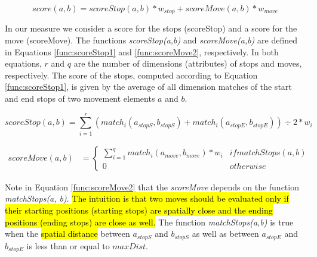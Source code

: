\documentclass[12pt]{article}
\begin{document}
\begin{equation}
\label{func:score1}
score(a, b) = scoreStop(a, b) * w_{stop} + scoreMove(a, b) * w_{move}  
\end{equation}


In our measure we consider a score for the stops (scoreStop) and a score for the move (scoreMove). The functions \emph{scoreStop(a,b)} and \emph{scoreMove(a,b)} are defined in Equations \ref{func:scoreStop1} and \ref{func:scoreMove2}, respectively. In both equations, $r$ and $q$ are the number of dimensions (attributes) of stops and moves, respectively. The score of the stops, computed according to Equation \ref{func:scoreStop1}, is given by the average of all dimension matches of the start and end stops of two movement elements $a$ and $b$. 


\begin{equation}
\label{func:scoreStop1}
  scoreStop(a, b) = \sum\limits_{i=1}^r (match_i(a_{stopS}, b_{stopS}) + match_i(a_{stopE}, b_{stopE}))\div 2* w_{i}
\end{equation}


\begin{equation}
\label{func:scoreMove2}
\begin{split}
scoreMove(a, b)  & = 
  \begin{cases} 
      \sum\limits_{i=1}^q match_i(a_{move}, b_{move}) * w_{i} & if matchStops(a, b)\\
      0 & otherwise
  \end{cases}
\end{split}
\end{equation}


Note in Equation \ref{func:scoreMove2} that the \emph{scoreMove} depends on the function \textit{matchStops(a, b)}. \hl{The intuition is that two moves should be evaluated only if their starting positions (starting stops) are spatially close and the ending positions (ending stops) are close as well.}
The function \emph{matchStops(a,b)} is true when the \hl{spatial distance} between $a_{stopS}$ and $b_{stopS}$  as well as between $a_{stopE}$ and $b_{stopE}$ is less than or equal to $maxDist$.
    
\end{document}
